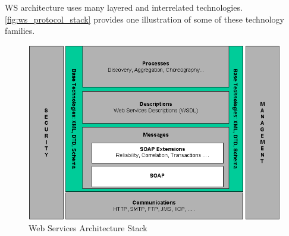 WS architecture uses many layered and interrelated technologies.
\autoref{fig:ws_protocol_stack} provides one illustration of some of these technology families.

\begin{center}
 \begin{figure}[h]
	\includegraphics[width=\textwidth]{../images/preliminaries/ws_protocol_stack.png}
	\caption{Web Services Architecture Stack \cite{ws_arch} }
	\label{fig:ws_protocol_stack}
 \end{figure}
\end{center}

